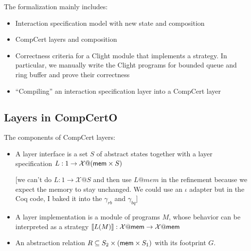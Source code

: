 \documentclass[sigplan,10pt,authordraft]{acmart}
\begin{document}
The formalization mainly includes:
\begin{itemize}
\item Interaction specification model with new state and composition
\item CompCert layers and composition
\item Correctness criteria for a Clight module that implements a strategy. In
  particular, we manually write the Clight programs for bounded queue and ring
  buffer and prove their correctness
\item ``Compiling'' an interaction specification layer into a CompCert layer
\end{itemize}

\subsection{Layers in CompCertO}

The components of CompCert layers:
\begin{itemize}
\item A layer interface is a set $S$ of abstract states together with a layer
  specification $L : 1 \rightarrow \mathcal{X} @ ( \mathsf{mem}  \times S)$

  [we can't do $L: 1 \rightarrow \mathcal{X}@S$ and then use $L@mem$ in the
  refinement because we expect the memory to stay unchanged. We could use an
  $\iota$ adapter but in the Coq code, I baked it into the $\gamma_{rb}$ and
  $\gamma_{bq}$]

\item A layer implementation is a module of programs $M$, whose behavior
  can be interpreted as a strategy
  $\llbracket L(M) \rrbracket : \mathcal{X}@ \mathsf{mem}  \rightarrow
  \mathcal{X}@ \mathsf{mem} $
  
\item An abstraction relation $R \subseteq S_2 \times ( \mathsf{mem}  \times S_1)$
  with its footprint $G$.
\end{itemize}
\end{document}
